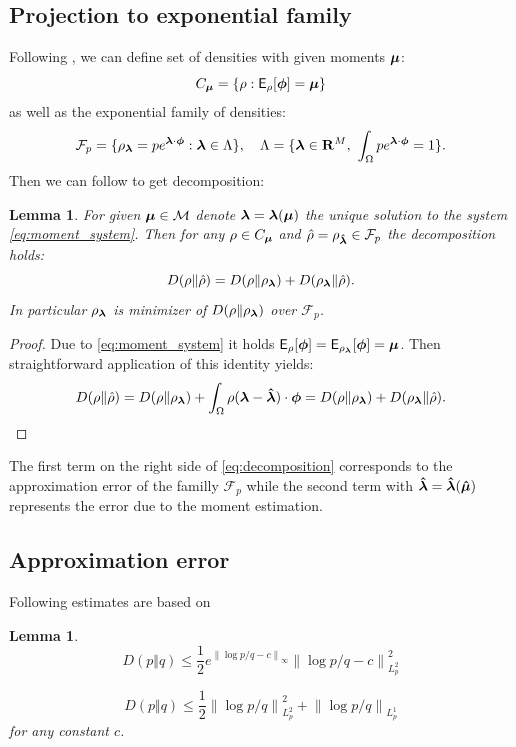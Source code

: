 \documentclass{article}
\newtheorem{lemma}[theorem]{Lemma}
\def\vc#1{\mathbf{\boldsymbol{#1}}}     %
\def \E{{\mathsf E}}
\newcommand{\norm}[1]{\left\lVert#1\right\rVert}
\def\R{\mathbf{R}}
\begin{document}
\subsection{Projection to exponential family}

Following \cite{Barron1991}, we can define set of densities with given moments $\vmu$:
\[
    C_{\vmu} = \{ \rho : \E_\rho[\vphi] = \vmu \}
\]
as well as the exponential family of densities:
\[
    \mathcal F_{p} = \{ \rho_\vl = 
    p e^{\vl\cdot\vphi} :
    \vl \in \Lambda\},\quad \Lambda = 
    \{\vl\in\R^M,\ \int_\Omega p e^{\vl\cdot\vphi} = 1\}.
\]
Then we can follow \cite[Lemma 2]{Barron1991} to get decomposition:
\begin{lemma}
\label{thm:decomposition}
For given $\vmu \in \mathcal M$ denote $\vl =\vl(\vmu)$ the unique solution to the system \eqref{eq:moment_system}. Then for any $\rho \in C_{\vmu}$ and $\estrho=\rho_\estvl \in\mathcal F_p$ the decomposition holds:
\begin{equation}
    \label{eq:decomposition}
    D(\rho\Vert\estrho) = D(\rho\Vert\rho_{\vl}) + D(\rho_{\vl}\Vert
    \estrho).
\end{equation}
In particular $\rho_{\vl}$ is minimizer of $D(\rho\Vert\rho_{\vl})$ over $\mathcal F_p$.
\end{lemma}
\begin{proof}
Due to \eqref{eq:moment_system} it holds $\E_{\rho}[\vphi] = \E_{\rho_{\vl}}[\vphi] = \vmu$. Then straightforward application of this identity yields:
\[
 D(\rho\Vert\estrho) = D(\rho\Vert\rho_{\vl}) 
 + \int_\Omega \rho (\vl - \estvl)\cdot \vc \phi = D(\rho\Vert\rho_{\vl}) + D(\rho_{\vl}\Vert\estrho).
\]
\end{proof}
The first term  on the right side of \eqref{eq:decomposition} corresponds to the approximation error of the familly $\mathcal F_p$ while the second term with $\estvl = \estvl(\estvmu)$ represents the error due to the moment estimation. 

\subsection{Approximation error}
Following estimates are based on \cite[Lemma 2]{Barron1991} 
\begin{lemma} 
  \begin{equation}
      \label{eq:l2_estimate}
      D(p\Vert q) \le \frac{1}{2}e^{\norm{\log p/q - c}_\infty} \norm{\log p/ q - c}_{L^2_p}^2
  \end{equation}

  
  \begin{equation}
      \label{eq:l1_estimate}
      D(p\Vert q) \le \frac{1}{2}\norm{\log p/ q}^2_{L^2_p} + \norm{\log p/ q}_{L^1_p}
  \end{equation}
 for any constant $c$.
\end{lemma}
\end{document}
